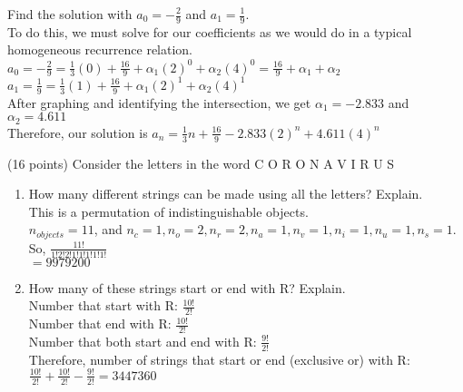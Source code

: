 \documentclass[12pt, letterpaper]{article}
\begin{document}
\begin{flushleft}
\begin{enumerate}
\begin{item}
\begin{enumerate}
    \begin{item} Find the solution with $a_0 = -\frac{2}{9}$ and $a_1 = \frac{1}{9}$. \\
      \smallskip
      To do this, we must solve for our coefficients as we would do in a typical homogeneous recurrence relation. \\
      $a_0 = -\frac{2}{9} = \frac{1}{3}(0) + \frac{16}{9} + \alpha_1(2)^0 + \alpha_2(4)^0 = \frac{16}{9}+\alpha_1+\alpha_2$ \\
      $a_1 = \frac{1}{9} = \frac{1}{3}(1)+\frac{16}{9}+\alpha_1(2)^1+\alpha_2(4)^1$ \\
      After graphing and identifying the intersection, we get $\alpha_1 = -2.833$ and $\alpha_2 = 4.611$ \\
      Therefore, our solution is $a_n = \frac{1}{3}n+\frac{16}{9}-2.833(2)^n+4.611(4)^n$ \\
    \end{item}
    \end{enumerate}
  \end{item}

  \begin{item} (16 points) Consider the letters in the word C O R O N A V I R U S \\
    \begin{enumerate}
    \item How many different strings can be made using all the letters? Explain. \\
      \medskip
      This is a permutation of indistinguishable objects. \\
      $n_{objects} = 11$, and $n_c = 1, n_o = 2, n_r = 2, n_a = 1, n_v = 1, n_i = 1, n_u = 1, n_s = 1$. \\
      So, $\frac{11!}{1!2!2!1!1!1!1!1!}$ \\
      $ = 9979200 $ \\
      \medskip
    \item How many of these strings start or end with R? Explain. \\
      \smallskip
      Number that start with R: $\frac{10!}{2!}$ \\
      Number that end with R: $\frac{10!}{2!}$ \\
      Number that both start and end with R: $\frac{9!}{2!}$ \\
      Therefore, number of strings that start or end (exclusive or) with R: $\frac{10!}{2!} + \frac{10!}{2!} - \frac{9!}{2!} = 3447360$ \\


\end{enumerate}
\end{item}
\end{enumerate}
\end{flushleft}
\end{document}
